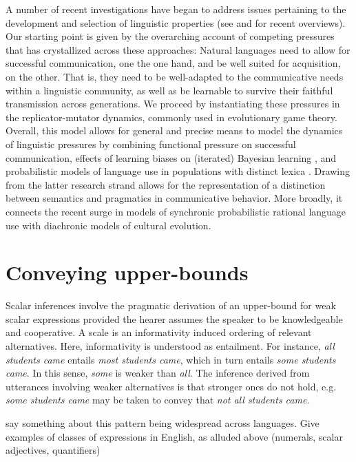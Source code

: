 \documentclass[a4paper]{article}
\newcommand{\hl}[1]{\textcolor[rgb]{.8,.33,.0}{#1}}%
\begin{document}
A number of recent investigations have began to address issues pertaining to the development and selection of linguistic properties (see \citealt{steels:2015} and \citealt{tamariz+kirby:2016} for recent overviews). Our starting point is given by the overarching account of competing pressures that has crystallized across these approaches: Natural languages need to allow for successful communication, one the one hand, and be well suited for acquisition, on the other. That is, they need to be well-adapted to the communicative needs within a linguistic community, as well as be learnable to survive their faithful transmission across generations. We proceed by instantiating these pressures in the replicator-mutator dynamics, commonly used in evolutionary game theory. Overall, this model allows for general and precise means to model the dynamics of linguistic pressures by combining functional pressure on successful communication, effects of learning biases on (iterated) Bayesian learning \citep{griffiths+kalish:2007}, and  probabilistic models of language use in populations with distinct lexica \citep{frank+goodman:2012,franke+jaeger:2014, bergen+etal:2016}. Drawing from the latter research strand allows for the representation of a distinction between semantics and pragmatics in communicative behavior. More broadly, it connects the recent surge in models of synchronic probabilistic rational language use with diachronic models of cultural evolution.


\section{Conveying upper-bounds}
Scalar inferences involve the pragmatic derivation of an upper-bound for weak scalar expressions provided the hearer assumes the speaker to be knowledgeable and cooperative. A scale is an informativity induced ordering of relevant alternatives. Here, informativity is understood as entailment. For instance, {\em all students came} entails {\em most students came}, which in turn entails {\em some students came}. In this sense, {\em some} is weaker than {\em all}. The inference derived from utterances involving weaker alternatives is that stronger ones do not hold, e.g. {\em some students came} may be taken to convey that {\em not all students came}.

\hl{say something about this pattern being widespread across languages. Give examples of classes of expressions in English, as alluded above (numerals, scalar adjectives, quantifiers)}
\end{document}
